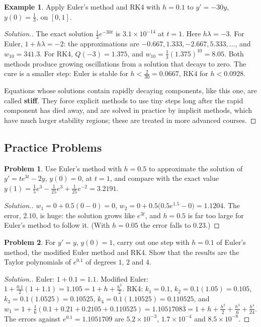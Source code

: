 \documentclass[11pt,a4paper]{article}
\numberwithin{equation}{section}
\theoremstyle{definition}
\newtheorem{exa}[thm]{Example}
\newtheorem{problemx}{Problem}[subsection]
\newenvironment{problem}{\begin{problemx}}{\end{problemx}}
\newenvironment{solution}
  {\renewcommand{\qedsymbol}{}\begin{proof}[\textit{Solution}.]}
  {\end{proof}}
\begin{document}
\begin{exa}
\label{exa:stiff}
Apply Euler's method and RK4 with $h = 0.1$ to $y' = -30y$, $y(0) = \frac13$, on $[0,1]$.
\end{exa}

\begin{solution}
The exact solution $\frac13e^{-30t}$ is $3.1\times10^{-14}$ at $t = 1$. Here $h\lambda = -3$. For Euler, $1+h\lambda = -2$: the approximations are
$-0.667, 1.333, -2.667, 5.333,\dots$, and $w_{10} = 341.3$. For RK4, $Q(-3) = 1.375$, and $w_{10} = \frac13(1.375)^{10} = 8.05$. Both methods produce
growing oscillations from a solution that decays to zero. The cure is a smaller step: Euler is stable for $h<\frac{2}{30} = 0.0667$, RK4
for $h<0.0928$.

Equations whose solutions contain rapidly decaying components, like this one, are called \textbf{stiff}. They force explicit methods to
use tiny steps long after the rapid component has died away, and are solved in practice by implicit methods, which have much larger
stability regions; these are treated in more advanced courses.
\end{solution}


\subsection{Practice Problems}

\begin{problem}
Use Euler's method with $h = 0.5$ to approximate the solution of $y' = te^{3t}-2y$, $y(0) = 0$, at $t = 1$, and compare with the exact value
$y(1) = \frac15e^3-\frac1{25}e^3+\frac1{25}e^{-2} = 3.2191$.
\end{problem}
\begin{solution}
$w_1 = 0+0.5(0-0) = 0$, $w_2 = 0+0.5\bigl(0.5e^{1.5}-0\bigr) = 1.1204$. The error, $2.10$, is huge: the solution grows like $e^{3t}$, and $h = 0.5$ is
far too large for Euler's method to follow it. (With $h = 0.05$ the error falls to $0.23$.)
\end{solution}

\begin{problem}
For $y' = y$, $y(0) = 1$, carry out one step with $h = 0.1$ of Euler's method, the modified Euler method and RK4. Show that the results are
the Taylor polynomials of $e^{0.1}$ of degrees $1$, $2$ and $4$.
\end{problem}
\begin{solution}
Euler: $1+0.1 = 1.1$. Modified Euler: $1+\frac{0.1}2(1+1.1) = 1.105 = 1+h+\frac{h^2}2$. RK4: $k_1 = 0.1$, $k_2 = 0.1(1.05) = 0.105$,
$k_3 = 0.1(1.0525) = 0.10525$, $k_4 = 0.1(1.10525) = 0.110525$, and $w_1 = 1+\frac16(0.1+0.21+0.2105+0.110525) = 1.1051708\overline3 = 1+h+\frac{h^2}2+\frac{h^3}6+\frac{h^4}{24}$.
The errors against $e^{0.1} = 1.1051709$ are $5.2\times10^{-3}$, $1.7\times10^{-4}$ and $8.5\times10^{-8}$.
\end{solution}
\end{document}
